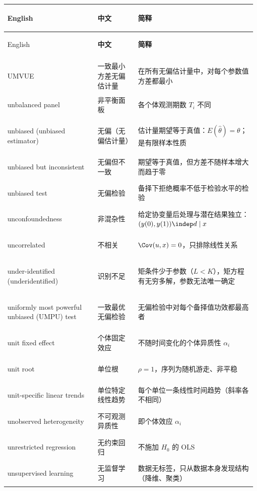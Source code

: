 \begin{longtable}{@{}>{\bfseries\boldmath\raggedright\arraybackslash}p{4.6cm}>{\raggedright\arraybackslash}p{3.2cm}>{\raggedright\arraybackslash}p{\dimexpr\textwidth-7.8cm-4\tabcolsep\relax}@{}}
\toprule
English & \textbf{中文} & \textbf{简释}\\
\midrule
\endfirsthead
\toprule
English & \textbf{中文} & \textbf{简释}\\
\midrule
\endhead
\midrule
\multicolumn{3}{r@{}}{\footnotesize\itshape （续下页）}\\
\endfoot
\bottomrule
\endlastfoot
UMVUE & 一致最小方差无偏估计量 & 在所有无偏估计量中，对每个参数值方差都最小 \\
unbalanced panel & 非平衡面板 & 各个体观测期数 $T_i$ 不同 \\
unbiased (unbiased estimator) & 无偏（无偏估计量） & 估计量期望等于真值：$E(\hat\theta)=\theta$；是有限样本性质 \\
unbiased but inconsistent & 无偏但不一致 & 期望等于真值，但方差不随样本增大而趋于零 \\
unbiased test & 无偏检验 & 备择下拒绝概率不低于检验水平的检验 \\
unconfoundedness & 非混杂性 & 给定协变量后处理与潜在结果独立：$(y(0),y(1))\indep d\mid x$ \\
uncorrelated & 不相关 & $\Cov(u,x)=0$，只排除线性关系 \\
under-identified (underidentified) & 识别不足 & 矩条件少于参数（$L<K$），矩方程有无穷多解，参数无法唯一确定 \\
uniformly most powerful unbiased (UMPU) test & 一致最优无偏检验 & 无偏检验中对每个备择值功效都最高者 \\
unit fixed effect & 个体固定效应 & 不随时间变化的个体异质性 $\alpha_i$ \\
unit root & 单位根 & $\rho=1$，序列为随机游走、非平稳 \\
unit-specific linear trends & 单位特定线性趋势 & 每个单位一条线性时间趋势（斜率各不相同） \\
unobserved heterogeneity & 不可观测异质性 & 即个体效应 $\alpha_i$ \\
unrestricted regression & 无约束回归 & 不施加 $H_0$ 的 OLS \\
unsupervised learning & 无监督学习 & 数据无标签，只从数据本身发现结构（降维、聚类） \\
\end{longtable}

\par{}\ifdim\dimexpr\pagegoal-\pagetotal\relax<16\baselineskip\newpage\fi
